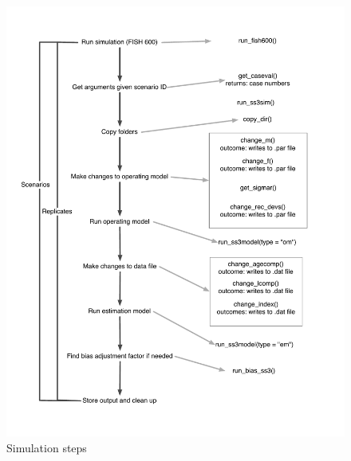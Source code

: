 \documentclass[12pt]{article}
\begin{document}


\begin{figure}[htbp]
  \centering
    \includegraphics[width=5.5in]{sim-steps.pdf}
  \caption{Simulation steps}
  \label{fig:sim-steps}
\end{figure}
\end{document}

